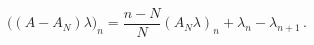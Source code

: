 \begin{equation}
\bigl((A-A_N)\lambda\bigr)_n=\frac{n-N}{N}(A_N\lambda)_n+
\lambda_n-\lambda_{n+1}\,.
\end{equation}

